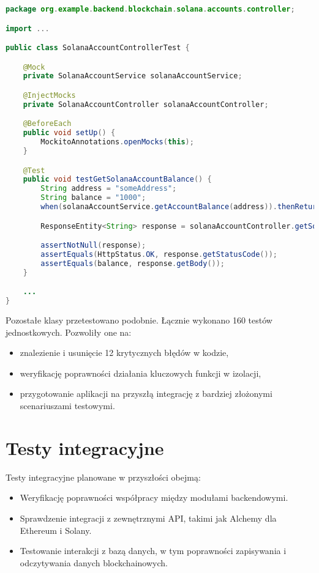 \begin{lstlisting}[language=Java, style=JavaStyle]
package org.example.backend.blockchain.solana.accounts.controller;

import ...

public class SolanaAccountControllerTest {

    @Mock
    private SolanaAccountService solanaAccountService;

    @InjectMocks
    private SolanaAccountController solanaAccountController;

    @BeforeEach
    public void setUp() {
        MockitoAnnotations.openMocks(this);
    }

    @Test
    public void testGetSolanaAccountBalance() {
        String address = "someAddress";
        String balance = "1000";
        when(solanaAccountService.getAccountBalance(address)).thenReturn(Optional.of(balance));

        ResponseEntity<String> response = solanaAccountController.getSolanaAccountBalance(address);

        assertNotNull(response);
        assertEquals(HttpStatus.OK, response.getStatusCode());
        assertEquals(balance, response.getBody());
    }

    ...
}
\end{lstlisting}

Pozostałe klasy przetestowano podobnie. Łącznie wykonano 160 testów jednostkowych. %
Pozwoliły one na:
\begin{itemize}
    \item znalezienie i usunięcie 12 krytycznych błędów w kodzie,
    \item weryfikację poprawności działania kluczowych funkcji w izolacji,
    \item przygotowanie aplikacji na przyszłą integrację z bardziej złożonymi scenariuszami testowymi.
\end{itemize}

\section{Testy integracyjne}
Testy integracyjne planowane w przyszłości obejmą:
\begin{itemize}
    \item Weryfikację poprawności współpracy między modułami backendowymi.
    \item Sprawdzenie integracji z zewnętrznymi API, takimi jak Alchemy dla Ethereum i Solany.
    \item Testowanie interakcji z bazą danych, w tym poprawności zapisywania i odczytywania danych blockchainowych.
\end{itemize}
